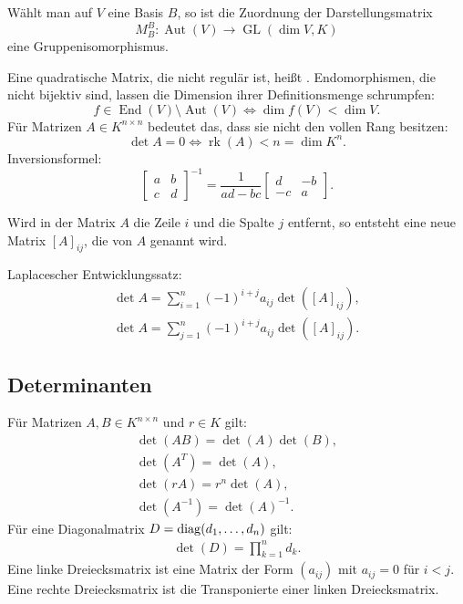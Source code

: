 Wählt man auf $V$ eine Basis
$B$, so ist die Zuordnung der Darstellungsmatrix
\begin{equation}
M_B^B\colon \operatorname{Aut}(V)\to\operatorname{GL}(\dim V,K)
\end{equation}
eine Gruppenisomorphismus.

Eine quadratische Matrix, die nicht regulär ist, heißt
. Endomorphismen, die nicht bijektiv sind, lassen
die Dimension ihrer Definitionsmenge schrumpfen:
\begin{equation}
f{\in}\operatorname{End}(V){\setminus}\operatorname{Aut}(V)
\Longleftrightarrow \dim f(V)<\dim V.
\end{equation}
Für Matrizen $A\in K^{n\times n}$ bedeutet das, dass sie nicht
den vollen Rang besitzen:
\begin{equation}
\det A=0\iff \operatorname{rk}(A) < n = \dim K^n.
\end{equation}
Inversionsformel:
\begin{equation}
\begin{bmatrix}
a & b\\
c & d
\end{bmatrix}^{-1}
= \frac{1}{ad-bc}\begin{bmatrix}
d & -b\\
-c & a
\end{bmatrix}.
\end{equation}
\begin{Definition}
Wird in der Matrix $A$ die Zeile $i$ und die Spalte $j$ entfernt,
so entsteht eine neue Matrix $[A]_{ij}$, die
von $A$ genannt wird.
\end{Definition}
Laplacescher Entwicklungssatz:
\begin{align}
\det A = \sum_{i=1}^n (-1)^{i+j}a_{ij}\det([A]_{ij}),\\
\det A = \sum_{j=1}^n (-1)^{i+j}a_{ij}\det([A]_{ij}).
\end{align}

\subsection{Determinanten}
Für Matrizen $A,B\in K^{n\times n}$ und $r\in K$ gilt:
\begin{gather}
\det(AB) = \det(A)\det(B),\\
\det(A^T) = \det(A),\\
\det(rA) = r^n\det(A),\\
\det(A^{-1}) = \det(A)^{-1}.
\end{gather}
Für eine Diagonalmatrix $D=\operatorname*{diag}(d_1,\ldots,d_n)$ gilt:
\begin{gather}
\det(D) = \prod_{k=1}^n d_k.
\end{gather}
Eine linke Dreiecksmatrix ist eine Matrix der Form
$(a_{ij})$ mit $a_{ij}=0$ für $i<j$. Eine rechte
Dreiecksmatrix ist die Transponierte einer linken
Dreiecksmatrix.

